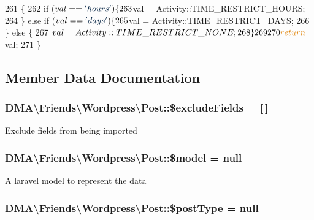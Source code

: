 \begin{DoxyCode}
261     \{
262         \textcolor{keywordflow}{if} ($val == \textcolor{stringliteral}{'hours'}) \{
263             $val = Activity::TIME\_RESTRICT\_HOURS;
264         \} \textcolor{keywordflow}{else} \textcolor{keywordflow}{if} ($val == \textcolor{stringliteral}{'days'}) \{
265             $val = Activity::TIME\_RESTRICT\_DAYS;
266         \} \textcolor{keywordflow}{else} \{
267             $val = Activity::TIME\_RESTRICT\_NONE;
268         \}
269 
270         \textcolor{keywordflow}{return} $val;
271     \}
\end{DoxyCode}


\subsection{Member Data Documentation}
\hypertarget{classDMA_1_1Friends_1_1Wordpress_1_1Post_ac9f76efeb858c94d5ab78e74b4301c16}{
\subsubsection[{\$exclude\-Fields}]{\setlength{\rightskip}{0pt plus 5cm}D\-M\-A\textbackslash{}\-Friends\textbackslash{}\-Wordpress\textbackslash{}\-Post\-::\$exclude\-Fields = \mbox{[}$\,$\mbox{]}\hspace{0.3cm}{\ttfamily [protected]}}}\label{classDMA_1_1Friends_1_1Wordpress_1_1Post_ac9f76efeb858c94d5ab78e74b4301c16}
Exclude fields from being imported \hypertarget{classDMA_1_1Friends_1_1Wordpress_1_1Post_a8a3df2e9db7f90d348d27ea9354176b1}{
\subsubsection[{\$model}]{\setlength{\rightskip}{0pt plus 5cm}D\-M\-A\textbackslash{}\-Friends\textbackslash{}\-Wordpress\textbackslash{}\-Post\-::\$model = null}}\label{classDMA_1_1Friends_1_1Wordpress_1_1Post_a8a3df2e9db7f90d348d27ea9354176b1}
A laravel model to represent the data \hypertarget{classDMA_1_1Friends_1_1Wordpress_1_1Post_a9b0ea251e8ba6b7161fc51ffa8fb72d8}{
\subsubsection[{\$post\-Type}]{\setlength{\rightskip}{0pt plus 5cm}D\-M\-A\textbackslash{}\-Friends\textbackslash{}\-Wordpress\textbackslash{}\-Post\-::\$post\-Type = null}}\label{classDMA_1_1Friends_1_1Wordpress_1_1Post_a9b0ea251e8ba6b7161fc51ffa8fb72d8}

